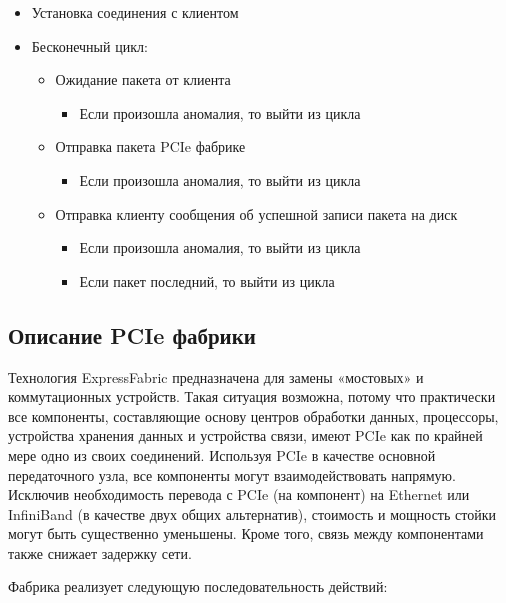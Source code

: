 \begin{itemize}
\item Установка соединения с клиентом
\item Бесконечный цикл:
	\begin{itemize}
		\item Ожидание пакета от клиента
		\begin{itemize}
			\item Если произошла аномалия, то выйти из цикла
		\end{itemize}
		
		\item Отправка пакета PCIe фабрике
		\begin{itemize}
			\item Если произошла аномалия, то выйти из цикла
		\end{itemize}		
		\item  Отправка клиенту сообщения об успешной записи пакета на диск 
		\begin{itemize}
			\item Если произошла аномалия, то выйти из цикла
		\end{itemize}
		\begin{itemize}
			\item Если пакет последний, то выйти из цикла
		\end{itemize}
	\end{itemize}
\end{itemize}

\subsection{Описание PCIe фабрики }

Технология ExpressFabric предназначена для замены «мостовых» и коммутационных устройств. Такая ситуация возможна, потому что практически все компоненты, составляющие основу центров обработки данных, процессоры, устройства хранения данных и устройства связи, имеют PCIe как по крайней мере одно из своих соединений. Используя PCIe в качестве основной передаточного узла, все компоненты могут взаимодействовать напрямую. Исключив необходимость перевода с PCIe (на компонент) на Ethernet или InfiniBand (в качестве двух общих альтернатив), стоимость и мощность стойки могут быть существенно уменьшены. Кроме того, связь между компонентами также снижает задержку сети.

Фабрика реализует следующую последовательность действий: 

